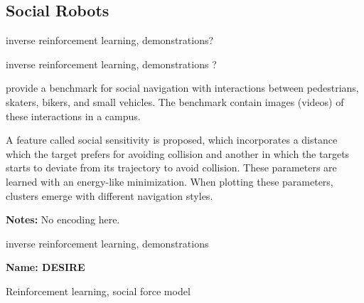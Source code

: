 \subsection{Social Robots}\label{subsec: social robots}


\cite{vasquez2014inverse} inverse reinforcement learning, demonstrations?


\cite{okal2016learning} inverse reinforcement learning, demonstrations ?


\cite{robicquet2016learning} provide a benchmark for social navigation with interactions between pedestrians, skaters, bikers, and small vehicles. 
%
The benchmark contain images (videos) of these interactions in a campus.

A feature called social sensitivity is proposed, which incorporates a distance which the target prefers for avoiding collision and another in which the targets starts to deviate from its trajectory to avoid collision.
%
These parameters are learned with an energy-like minimization.
%
When plotting these parameters, clusters emerge with different navigation styles.

\textbf{Notes:} No encoding here. 


\cite{kretzschmar2016socially} inverse reinforcement learning, demonstrations


\textbf{Name: DESIRE}

\cite{lee2017desire}


\cite{chen2017decentralized} Reinforcement learning, social force model



